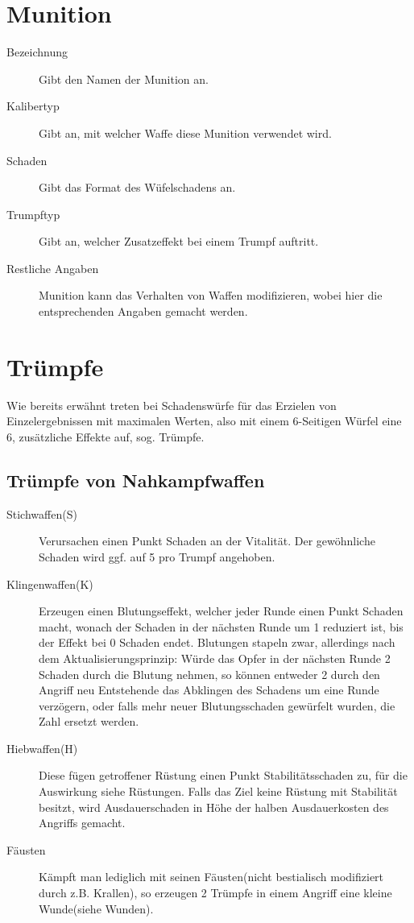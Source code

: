 \documentclass[a4paper,12pt,oneside]{book}
\begin{document}
\section{Munition}
\begin{description}
\item[Bezeichnung] Gibt den Namen der Munition an.
\item[Kalibertyp] Gibt an, mit welcher Waffe diese Munition verwendet wird. 
\item[Schaden] Gibt das Format des Wüfelschadens an.
\item[Trumpftyp] Gibt an, welcher Zusatzeffekt bei einem Trumpf auftritt.
\item[Restliche Angaben] Munition kann das Verhalten von Waffen modifizieren, wobei hier die entsprechenden Angaben gemacht werden.
\end{description}


\section{Trümpfe}
Wie bereits erwähnt treten bei Schadenswürfe für das Erzielen von Einzelergebnissen mit maximalen Werten, also mit einem 6-Seitigen Würfel eine 6, zusätzliche Effekte auf, sog. Trümpfe.
\subsection{Trümpfe von Nahkampfwaffen}
\begin{description}
\item[Stichwaffen(S)] Verursachen einen Punkt Schaden an der Vitalität. Der gewöhnliche Schaden wird ggf. auf 5 pro Trumpf angehoben.
\item[Klingenwaffen(K)] Erzeugen einen Blutungseffekt, welcher jeder Runde einen Punkt Schaden macht, wonach der Schaden in der nächsten Runde um 1 reduziert ist, bis der Effekt bei 0 Schaden endet. Blutungen stapeln zwar, allerdings nach dem Aktualisierungsprinzip: Würde das Opfer in der nächsten Runde 2 Schaden durch die Blutung nehmen, so können entweder 2 durch den Angriff neu Entstehende das Abklingen des Schadens um eine Runde verzögern, oder falls mehr neuer Blutungsschaden gewürfelt wurden, die Zahl ersetzt werden.
\item[Hiebwaffen(H)] Diese fügen getroffener Rüstung einen Punkt Stabilitätsschaden zu, für die Auswirkung siehe Rüstungen. Falls das Ziel keine Rüstung mit Stabilität besitzt, wird Ausdauerschaden in Höhe der halben Ausdauerkosten des Angriffs gemacht.
\item[Fäusten] Kämpft man lediglich mit seinen Fäusten(nicht bestialisch modifiziert durch z.B. Krallen), so erzeugen 2 Trümpfe in einem Angriff eine kleine Wunde(siehe Wunden).
\end{description}
\end{document}
